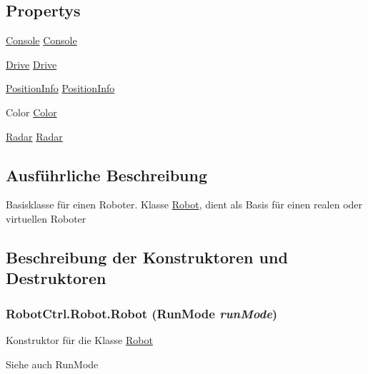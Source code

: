 \subsection*{Propertys}
\begin{DoxyCompactItemize}
\item 
\hyperlink{class_robot_ctrl_1_1_console}{Console} \hyperlink{class_robot_ctrl_1_1_robot_ae78d1691cc943383977741712962bf82}{Console}
\item 
\hyperlink{class_robot_ctrl_1_1_drive}{Drive} \hyperlink{class_robot_ctrl_1_1_robot_a6e1e59f43f8578d78da6c6a19e55f269}{Drive}
\item 
\hyperlink{struct_robot_ctrl_1_1_position_info}{PositionInfo} \hyperlink{class_robot_ctrl_1_1_robot_abf06b5671ccaf469cc251723ec811002}{PositionInfo}
\item 
Color \hyperlink{class_robot_ctrl_1_1_robot_a894338ff794429cdf09647ff8d73d83e}{Color}
\item 
\hyperlink{class_robot_ctrl_1_1_radar}{Radar} \hyperlink{class_robot_ctrl_1_1_robot_adcc563b2531e72dcdfb9af5cafda1cbc}{Radar}
\end{DoxyCompactItemize}


\subsection{Ausführliche Beschreibung}
Basisklasse f\"{u}r einen Roboter. Klasse \hyperlink{class_robot_ctrl_1_1_robot}{Robot}, dient als Basis f\"{u}r einen realen oder virtuellen Roboter 

\subsection{Beschreibung der Konstruktoren und Destruktoren}
\hypertarget{class_robot_ctrl_1_1_robot_acdd921df41328916b058eaad84ed3078}{
\subsubsection[{Robot}]{\setlength{\rightskip}{0pt plus 5cm}RobotCtrl.Robot.Robot (RunMode {\em runMode})}}
\label{class_robot_ctrl_1_1_robot_acdd921df41328916b058eaad84ed3078}
Konstruktor f\"{u}r die Klasse \hyperlink{class_robot_ctrl_1_1_robot}{Robot} \begin{DoxySeeAlso}{Siehe auch}
RunMode
\end{DoxySeeAlso}

